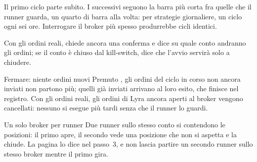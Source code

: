 \noindent
Il primo ciclo parte subito. I successivi seguono la barra più corta fra
quelle che il runner guarda, un quarto di barra alla volta: per strategie
giornaliere, un ciclo ogni sei ore. Interrogare il broker più spesso
produrrebbe cicli identici.

\noindent
Con gli ordini reali,  chiede ancora una conferma e dice su
quale conto andranno gli ordini; se il conto è chiuso dal kill-switch, dice
che l'avvio servirà solo a chiudere.

\begin{nota}{Fermare: niente ordini nuovi}
Premuto , gli ordini del ciclo in corso non ancora inviati
non partono più; quelli già inviati arrivano al loro esito, che finisce nel
registro. Con gli ordini reali, gli ordini di Lyra ancora aperti al broker
vengono cancellati: nessuno si esegue più tardi senza che il runner lo
guardi.
\end{nota}

\begin{attenzione}{Un solo broker per runner}
Due runner sullo stesso conto si contendono le posizioni: il primo apre, il
secondo vede una posizione che non si aspetta e la chiude. La pagina lo dice
nel passo~\num{3}, e non lascia partire un secondo runner sullo stesso
broker mentre il primo gira.
\end{attenzione}

\flushbottom
